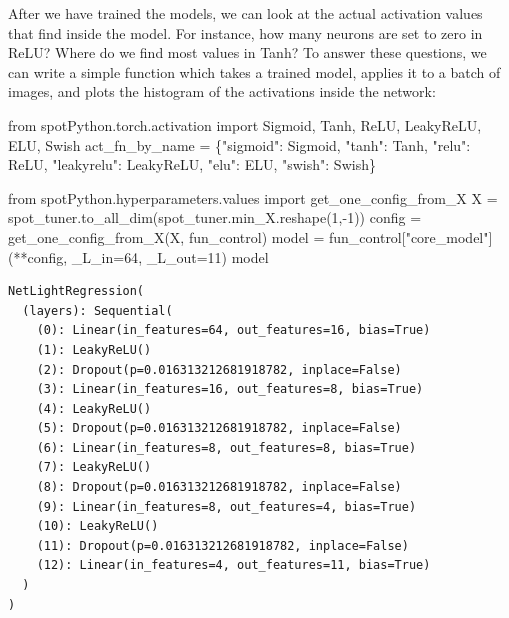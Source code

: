 \documentclass[
  letterpaper,
  DIV=11,
  numbers=noendperiod]{scrreprt}
\newenvironment{Shaded}{\begin{snugshade}}{\end{snugshade}}
\newcommand{\DecValTok}[1]{\textcolor[rgb]{0.68,0.00,0.00}{#1}}
\newcommand{\ImportTok}[1]{\textcolor[rgb]{0.00,0.46,0.62}{#1}}
\newcommand{\NormalTok}[1]{\textcolor[rgb]{0.00,0.23,0.31}{#1}}
\newcommand{\OperatorTok}[1]{\textcolor[rgb]{0.37,0.37,0.37}{#1}}
\newcommand{\StringTok}[1]{\textcolor[rgb]{0.13,0.47,0.30}{#1}}
\begin{document}
After we have trained the models, we can look at the actual activation
values that find inside the model. For instance, how many neurons are
set to zero in ReLU? Where do we find most values in Tanh? To answer
these questions, we can write a simple function which takes a trained
model, applies it to a batch of images, and plots the histogram of the
activations inside the network:

\begin{Shaded}
\begin{Highlighting}[]
\ImportTok{from}\NormalTok{ spotPython.torch.activation }\ImportTok{import}\NormalTok{ Sigmoid, Tanh, ReLU, LeakyReLU, ELU, Swish}
\NormalTok{act\_fn\_by\_name }\OperatorTok{=}\NormalTok{ \{}\StringTok{"sigmoid"}\NormalTok{: Sigmoid, }\StringTok{"tanh"}\NormalTok{: Tanh, }\StringTok{"relu"}\NormalTok{: ReLU, }\StringTok{"leakyrelu"}\NormalTok{: LeakyReLU, }\StringTok{"elu"}\NormalTok{: ELU, }\StringTok{"swish"}\NormalTok{: Swish\}}
\end{Highlighting}
\end{Shaded}

\begin{Shaded}
\begin{Highlighting}[]
\ImportTok{from}\NormalTok{ spotPython.hyperparameters.values }\ImportTok{import}\NormalTok{ get\_one\_config\_from\_X}
\NormalTok{X }\OperatorTok{=}\NormalTok{ spot\_tuner.to\_all\_dim(spot\_tuner.min\_X.reshape(}\DecValTok{1}\NormalTok{,}\OperatorTok{{-}}\DecValTok{1}\NormalTok{))}
\NormalTok{config }\OperatorTok{=}\NormalTok{ get\_one\_config\_from\_X(X, fun\_control)}
\NormalTok{model }\OperatorTok{=}\NormalTok{ fun\_control[}\StringTok{"core\_model"}\NormalTok{](}\OperatorTok{**}\NormalTok{config, \_L\_in}\OperatorTok{=}\DecValTok{64}\NormalTok{, \_L\_out}\OperatorTok{=}\DecValTok{11}\NormalTok{)}
\NormalTok{model}
\end{Highlighting}
\end{Shaded}

\begin{verbatim}
NetLightRegression(
  (layers): Sequential(
    (0): Linear(in_features=64, out_features=16, bias=True)
    (1): LeakyReLU()
    (2): Dropout(p=0.016313212681918782, inplace=False)
    (3): Linear(in_features=16, out_features=8, bias=True)
    (4): LeakyReLU()
    (5): Dropout(p=0.016313212681918782, inplace=False)
    (6): Linear(in_features=8, out_features=8, bias=True)
    (7): LeakyReLU()
    (8): Dropout(p=0.016313212681918782, inplace=False)
    (9): Linear(in_features=8, out_features=4, bias=True)
    (10): LeakyReLU()
    (11): Dropout(p=0.016313212681918782, inplace=False)
    (12): Linear(in_features=4, out_features=11, bias=True)
  )
)
\end{verbatim}
\end{document}
